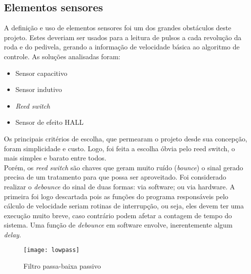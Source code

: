 \documentclass[a4paper,11pt]{article}
\begin{document}
\subsection{Elementos sensores}
\label{sensores}
A definição e uso de elementos sensores foi um dos grandes obstáculos deste projeto. Estes deveriam ser usados para a leitura de pulsos a cada revolução da roda e do pedivela, gerando a informação de velocidade básica ao algoritmo de controle. As soluções analisadas foram:
\begin{itemize}
 \item Sensor capacitivo
 \item Sensor indutivo
 \item \textit{Reed switch}
 \item Sensor de efeito HALL
\end{itemize}
Os principais critérios de escolha, que permearam o projeto desde sua concepção,
foram simplicidade e custo. Logo, foi feita a escolha óbvia pelo reed switch, o
mais simples e barato entre todos. \\
Porém, os \textit{reed switch} são chaves que geram muito ruído
(\textit{bounce}) o sinal gerado precisa de um tratamento para que possa ser
aproveitado. Foi considerado realizar o \textit{debounce} do sinal de duas
formas: via software; ou via hardware. A primeira foi logo descartada pois as
funções do programa responsáveis pelo cálculo de velocidade seriam rotinas de
interrupção, ou seja, eles devem ter uma execução muito breve, caso contrário
podem afetar a contagem de tempo do sistema. Uma função de \textit{debounce} em
software envolve, inerentemente algum \textit{delay}.\\

\begin{figure}[ht]
 \begin{center}
  \texttt{[image: lowpass]}
 \end{center}
 \caption{Filtro passa-baixa passivo}
 \label{fig:lowpass}
\end{figure}
\end{document}
